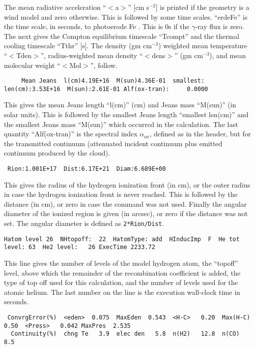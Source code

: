 The mean radiative acceleration ``$<$a$>$'' [cm s$^{-2}$] is printed if the geometry
is a wind model and zero otherwise.
This is followed by some time scales.
``erdeFe'' is the time scale, in seconds, to photoerode Fe
\citep{Boyd1987}.
This is 0s if the  $\gamma$-ray flux is zero.
The next gives the Compton
equilibrium timescale ``Tcompt'' and the thermal
cooling timescale ``Tthr'' [s].
The density (gm cm$^{-3}$) weighted mean temperature ``$<$Tden$>$'',
radius-weighted mean density ``$<$dens$>$'' (gm cm$^{-3}$),
and mean molecular weight ``$<$Mol$>$'', follow.
{\setverbatimfontsize{\tiny}
\begin{verbatim}
     Mean Jeans  l(cm)4.19E+16  M(sun)4.36E-01  smallest:     len(cm):3.53E+16  M(sun):2.61E-01 Alf(ox-tran):     0.0000
\end{verbatim}
}
This gives the mean Jeans length ``l(cm)'' (cm) and Jeans mass ``M(sun)''
(in solar units).
This is followed by the smallest Jeans length ``smallest
len(cm)'' and the smallest Jeans mass ``M(sun)'' which occurred in the
calculation.
The last quantity ``Alf(ox-tran)'' is the spectral index
$\alpha_{ox}$,
defined as in the header,
but for the transmitted continuum (attenuated
incident continuum plus emitted continuum produced by the cloud).
{\setverbatimfontsize{\tiny}
\begin{verbatim}
 Rion:1.001E+17  Dist:6.17E+21  Diam:6.689E+00
\end{verbatim}
}
This gives the radius of the hydrogen ionization front (in cm), or the outer radius in case
the hydrogen ionization front is never reached. This is followed by the distance (in cm), or
zero in case the  command was not used. Finally the angular diameter of
the ionized region is given (in arcsec), or zero if the distance was not set. The angular diameter
is defined as {\tt 2*Rion/Dist}.
{\setverbatimfontsize{\tiny}
\begin{verbatim}
Hatom level 26  NHtopoff:  22  HatomType: add  HInducImp  F  He tot level: 63  He2 level:   26 ExecTime 2233.72
\end{verbatim}
}

This line gives the number of levels of the model hydrogen atom, the
``topoff'' level, above which the remainder of the recombination coefficient
is added, the type of top off used for this calculation, and the number
of levels used for the atomic helium.
The last number on the line is the
execution wall-clock time in seconds.

{\setverbatimfontsize{\tiny}
\begin{verbatim}
 ConvrgError(%)  <eden>  0.075  MaxEden  0.543  <H-C>   0.20  Max(H-C)    0.50  <Press>   0.042 MaxPres  2.535
  Continuity(%)  chng Te   3.9  elec den   5.8  n(H2)   12.8  n(CO)        8.5
\end{verbatim}
}

